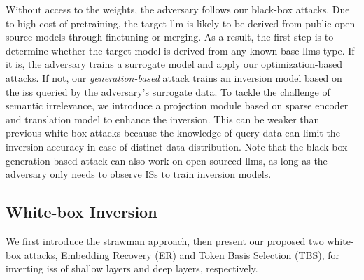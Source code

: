 \documentclass[letterpaper,twocolumn,10pt]{article}
\theoremstyle{definition}
\begin{document}
Without access to the weights, the adversary follows our black-box attacks.
Due to high cost of pretraining, the target \ac{llm} is likely to be derived from public open-source models through finetuning or merging.
As a result, the first step is to determine whether the target model is derived from any known base \acp{llm} type.
If it is, the adversary trains a surrogate model and apply our optimization-based attacks.
If not, our \textit{generation-based} attack trains an inversion model based on the \acp{is} queried by the adversary's surrogate data.
To tackle the challenge of semantic irrelevance, we introduce a projection module based on sparse encoder~\cite{zhang2024extracting} and translation model to enhance the inversion.
This can be weaker than previous white-box attacks because the knowledge of query data can limit the inversion accuracy in case of distinct data distribution.
Note that the black-box generation-based attack can also work on open-sourced \acp{llm}, as long as the adversary only needs to observe ISs to train inversion models.








\subsection{White-box Inversion}
We first introduce the strawman approach, then present our proposed two white-box attacks, Embedding Recovery (ER) and Token Basis Selection (TBS), for inverting \acp{is} of shallow layers and deep layers, respectively.
\end{document}
